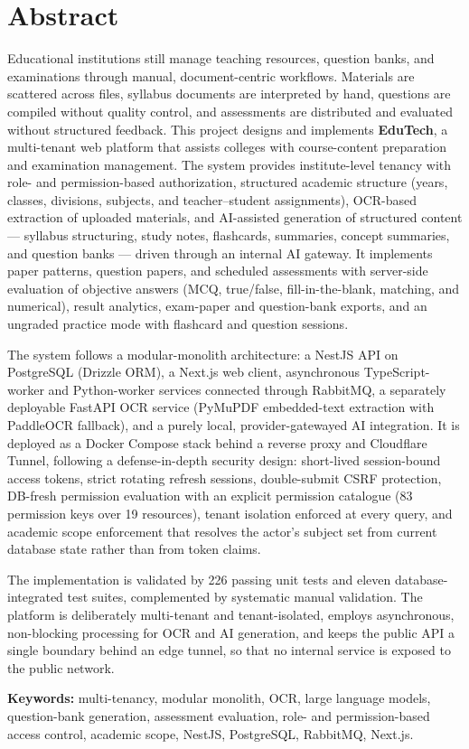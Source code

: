 \chapter*{Abstract}
\thispagestyle{fancy}

\noindent Educational institutions still manage teaching resources, question
banks, and examinations through manual, document-centric workflows. Materials
are scattered across files, syllabus documents are interpreted by hand,
questions are compiled without quality control, and assessments are distributed
and evaluated without structured feedback. This project designs and implements
\textbf{EduTech}, a multi-tenant web platform that assists colleges with
course-content preparation and examination management. The system provides
institute-level tenancy with role- and permission-based authorization,
structured academic structure (years, classes, divisions, subjects, and
teacher--student assignments), OCR-based extraction of uploaded materials, and
AI-assisted generation of structured content --- syllabus structuring, study
notes, flashcards, summaries, concept summaries, and question banks --- driven
through an internal AI gateway. It implements paper patterns, question papers,
and scheduled assessments with server-side evaluation of objective answers
(MCQ, true/false, fill-in-the-blank, matching, and numerical), result analytics,
exam-paper and question-bank exports, and an ungraded practice mode with
flashcard and question sessions.

\noindent The system follows a modular-monolith architecture: a NestJS API on
PostgreSQL (Drizzle ORM), a Next.js web client, asynchronous TypeScript-worker
and Python-worker services connected through RabbitMQ, a separately deployable
FastAPI OCR service (PyMuPDF embedded-text extraction with PaddleOCR fallback),
and a purely local, provider-gatewayed AI integration. It is deployed as a
Docker Compose stack behind a reverse proxy and Cloudflare Tunnel, following a
defense-in-depth security design: short-lived session-bound access tokens,
strict rotating refresh sessions, double-submit CSRF protection, DB-fresh
permission evaluation with an explicit permission catalogue (83 permission
keys over 19 resources), tenant isolation enforced at every query, and academic
scope enforcement that resolves the actor's subject set from current database
state rather than from token claims.

\noindent The implementation is validated by 226 passing unit tests and eleven
database-integrated test suites, complemented by systematic manual validation.
The platform is deliberately multi-tenant and tenant-isolated, employs
asynchronous, non-blocking processing for OCR and AI generation, and keeps the
public API a single boundary behind an edge tunnel, so that no internal service
is exposed to the public network.

\vspace{1em}
\noindent\textbf{Keywords:} multi-tenancy, modular monolith, OCR, large language
models, question-bank generation, assessment evaluation, role- and
permission-based access control, academic scope, NestJS, PostgreSQL, RabbitMQ,
Next.js.